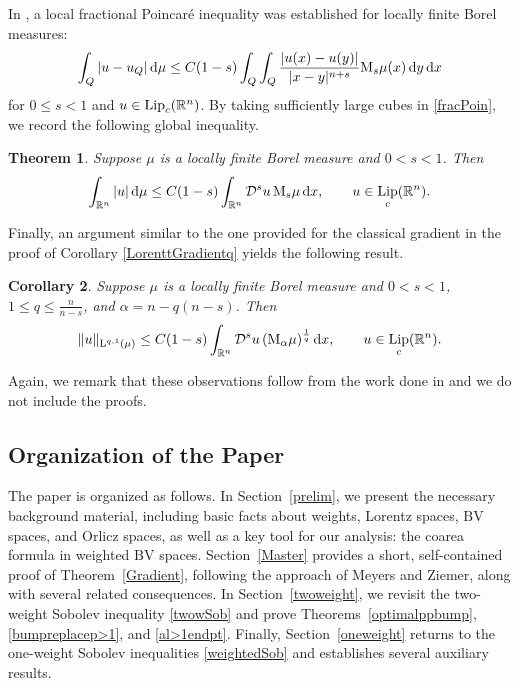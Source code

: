 \documentclass[11pt, a4paper, reqno]{amsart}
\newcommand{\R}{\mathbb R}
\newcommand{\D}{\mathcal D}
\newcommand{\al}{\alpha}
\newcommand{\dx}{\,{\mathrm dx}}
\newcommand{\dmu}{\,{\mathrm d\mu}}
\newcommand{\dy}{\,{\mathrm dy}}
\newcommand{\Lup}{\textup{L}}
\DeclareMathOperator{\Lip}{\textup{Lip}}
\newtheorem{theorem}{Theorem}[section]
\newtheorem{corollary}[theorem]{Corollary}
\theoremstyle{definition}
\theoremstyle{remark}
\begin{document}
In \cite{MPW}, a local fractional Poincaré inequality was established for locally finite Borel measures:
\begin{equation}\label{fracPoin}\int_Q|u-u_Q|\dmu\leq C(1-s)\int_Q\int_Q\frac{|u(x)-u(y)|}{|x-y|^{n+s}}\textup M_s \mu(x)\dy \dx\end{equation}
for $0\leq s<1$ and $u\in \Lip_c(\R^n)$. By taking sufficiently large cubes in \eqref{fracPoin}, we record the following global inequality.

\begin{theorem} Suppose $\mu$ is a locally finite Borel measure and $0<s<1$. Then
$$\int_{\R^n}|u|\dmu\leq C(1-s)\int_{\R^n} \D^su\, \textup{M}_s\mu\dx, \qquad u\in \Lip_c(\R^n).$$
\end{theorem}

Finally, an argument similar to the one provided for the classical gradient in the proof of Corollary \ref{LorenttGradientq} yields the following result.

\begin{corollary} Suppose $\mu$ is a locally finite Borel measure and $0<s<1$, $1\leq q\leq \frac{n}{n-s}$, and $\al=n-q(n-s)$. Then
$$\|u\|_{\Lup^{q,1}(\mu)}\leq C(1-s)\int_{\R^n} \D^su\, (\textup{M}_\al\mu)^{\frac1q}\dx, \qquad u\in \Lip_c(\R^n).$$
\end{corollary}

Again, we remark that these observations follow from the work done in \cite{MPW} and we do not include the proofs.

\subsection{Organization of the Paper}

The paper is organized as follows. In Section~\ref{prelim}, we present the necessary background material, including basic facts about weights, Lorentz spaces, $\text{BV}$ spaces, and Orlicz spaces, as well as a key tool for our analysis: the coarea formula in weighted $\text{BV}$ spaces. Section~\ref{Master} provides a short, self-contained proof of Theorem~\ref{Gradient}, following the approach of Meyers and Ziemer, along with several related consequences. In Section~\ref{twoweight}, we revisit the two-weight Sobolev inequality \eqref{twowSob} and prove Theorems~\ref{optimalppbump}, \ref{bumpreplacep>1}, and \ref{al>1endpt}. Finally, Section~\ref{oneweight} returns to the one-weight Sobolev inequalities \eqref{weightedSob} and establishes several auxiliary results.
\end{document}
